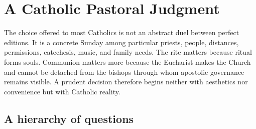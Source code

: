 \section{A Catholic Pastoral Judgment}

The choice offered to most Catholics is not an abstract duel between perfect editions. It is a concrete Sunday among particular priests, people, distances, permissions, catechesis, music, and family needs. The rite matters because ritual forms souls. Communion matters more because the Eucharist makes the Church and cannot be detached from the bishops through whom apostolic governance remains visible. A prudent decision therefore begins neither with aesthetics nor convenience but with Catholic reality.

\subsection{A hierarchy of questions}

